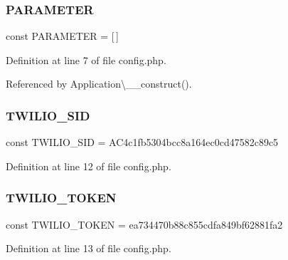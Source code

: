 \subsubsection{\texorpdfstring{P\+A\+R\+A\+M\+E\+T\+ER}{PARAMETER}}
{\footnotesize\ttfamily const P\+A\+R\+A\+M\+E\+T\+ER = \mbox{[}$\,$\mbox{]}}



Definition at line 7 of file config.\+php.



Referenced by Application\textbackslash{}\+\_\+\+\_\+construct().

\hypertarget{config_8php_a9b6aafbdebd605cd4fb6f5749b53e59f}{}\label{config_8php_a9b6aafbdebd605cd4fb6f5749b53e59f} 
\subsubsection{\texorpdfstring{T\+W\+I\+L\+I\+O\+\_\+\+S\+ID}{TWILIO\_SID}}
{\footnotesize\ttfamily const T\+W\+I\+L\+I\+O\+\_\+\+S\+ID = \textquotesingle{}A\+C4c1fb5304bcc8a164ec0cd47582c89c5\textquotesingle{}}



Definition at line 12 of file config.\+php.

\hypertarget{config_8php_a0477d5c66524299f08cae7376eb7884c}{}\label{config_8php_a0477d5c66524299f08cae7376eb7884c} 
\subsubsection{\texorpdfstring{T\+W\+I\+L\+I\+O\+\_\+\+T\+O\+K\+EN}{TWILIO\_TOKEN}}
{\footnotesize\ttfamily const T\+W\+I\+L\+I\+O\+\_\+\+T\+O\+K\+EN = \textquotesingle{}ea734470b88c855cdfa849bf62881fa2\textquotesingle{}}



Definition at line 13 of file config.\+php.

